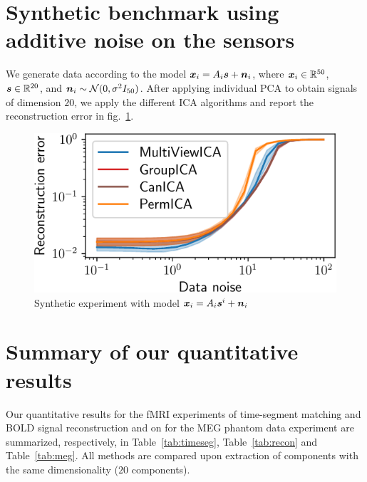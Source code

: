 \section{Synthetic benchmark using additive noise on the sensors}
\label{app:complex_cov}
We generate data according to the model $\boldsymbol{x}_i = A_i\boldsymbol{s} + \boldsymbol{n}_i$, where $\boldsymbol{x}_i \in \mathbb{R}^{50}$, $\boldsymbol{s} \in \mathbb{R}^{20}$, and $\boldsymbol{n}_i\sim \mathcal{N}(0, \sigma^2 I_{50})$. After applying individual PCA to obtain signals of dimension $20$, we apply the different ICA algorithms and report the reconstruction error in fig.~\ref{fig:reconstruction_synth}.

\begin{figure}
  \center
  \includegraphics[width=0.5\linewidth]{figures/mvica/distance.pdf}
  \caption{Synthetic experiment with model $\boldsymbol{x}_i = A_i\boldsymbol{s}^i + \boldsymbol{n}_i$} %
  \label{fig:reconstruction_synth}
\end{figure}

\section{Summary of our quantitative results}
\label{sec:app_real_data}
Our quantitative results for the fMRI experiments of time-segment matching and BOLD signal reconstruction and on for the MEG phantom data experiment are summarized, respectively, in Table~\ref{tab:timeseg}, Table~\ref{tab:recon} and Table~\ref{tab:meg}. All methods are compared upon extraction of components with the same dimensionality ($20$ components).

